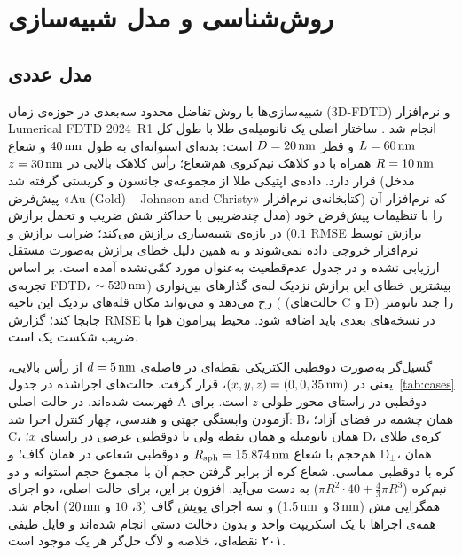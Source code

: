 \section{روش‌شناسی و مدل شبیه‌سازی}
\label{sec:method}

\subsection{مدل عددی}
\label{sec:method-model}

شبیه‌سازی‌ها با روش تفاضل محدود سه‌بعدی در حوزه‌ی زمان (3D-FDTD) و
نرم‌افزار Lumerical FDTD 2024~R1 انجام شد \cite{taflove2005computational}.
ساختار اصلی یک نانومیله‌ی طلا با طول کل $L = 60\,\text{nm}$ و قطر $D = 20\,\text{nm}$
است: بدنه‌ای استوانه‌ای به طول $40\,\text{nm}$ و شعاع $R = 10\,\text{nm}$ همراه با دو
کلاهک نیم‌کروی هم‌شعاع؛ رأس کلاهک بالایی در $z = 30\,\text{nm}$ قرار دارد.
داده‌ی اپتیکی طلا از مجموعه‌ی جانسون و کریستی \cite{johnson1972optical}
گرفته شد (مدخل پیش‌فرض «Au (Gold) -- Johnson and Christy» کتابخانه‌ی
نرم‌افزار) که نرم‌افزار آن را با تنظیمات پیش‌فرض خود (مدل چندضریبی با
حداکثر شش ضریب و تحمل برازش $0.1$) در بازه‌ی شبیه‌سازی برازش می‌کند؛
ضرایب برازش و RMSE برازش توسط نرم‌افزار خروجی داده نمی‌شوند و به همین دلیل
خطای برازش به‌صورت مستقل ارزیابی نشده و در جدول عدم‌قطعیت به‌عنوان مورد کمّی‌نشده
آمده است. بر اساس تجربه‌ی FDTD، بیشترین خطای این برازش نزدیک لبه‌ی گذارهای بین‌نواری
($\sim520\,\text{nm}$) رخ می‌دهد و می‌تواند مکان قله‌های نزدیک این ناحیه (حالت‌های C و D) را چند نانومتر جابجا کند؛
گزارش RMSE در نسخه‌های بعدی باید اضافه شود. محیط
پیرامون هوا با ضریب شکست یک است.

گسیل‌گر به‌صورت دوقطبی الکتریکی نقطه‌ای در فاصله‌ی $d = 5\,\text{nm}$ از رأس
بالایی، یعنی در $(x,y,z) = (0,0,35\,\text{nm})$، قرار گرفت. حالت‌های اجراشده
در جدول~\ref{tab:cases} فهرست شده‌اند. در حالت اصلی A دوقطبی در راستای
محور طولی $z$ است. برای آزمودن وابستگی جهتی و هندسی، چهار کنترل اجرا
شد: B، همان چشمه در فضای آزاد؛ C، همان نانومیله و همان نقطه ولی با دوقطبی
عرضی در راستای $x$؛ D، کره‌ی طلای هم‌حجم با شعاع
$R_{\text{sph}} = 15.874\,\text{nm}$ و دوقطبی شعاعی در همان گاف؛ و D$_\perp$،
همان کره با دوقطبی مماسی. شعاع کره از برابر گرفتن حجم آن با مجموع حجم
استوانه و دو نیم‌کره ($\pi R^2 \cdot 40 + \tfrac{4}{3}\pi R^3$) به دست
می‌آید. افزون بر این، برای حالت اصلی، دو اجرای همگرایی مش ($3\,\text{nm}$ و
$1.5\,\text{nm}$) و سه اجرای پویش گاف ($3$، $10$ و $20\,\text{nm}$) انجام شد. همه‌ی
اجراها با یک اسکریپت واحد و بدون دخالت دستی انجام شده‌اند و فایل طیفی
۲۰۱ نقطه‌ای، خلاصه و لاگ حل‌گر هر یک موجود است.


